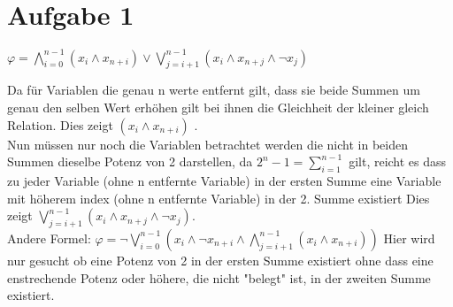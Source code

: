 \section*{Aufgabe 1}


$\varphi = \bigwedge_{i=0}^{n-1}(x_i \wedge x_{n+i}) \vee \bigvee_{j=i+1}^{n-1}( x_i \wedge x_{n+j} \wedge \neg x_{j})$ 



Da für Variablen die genau n werte entfernt gilt, dass sie beide Summen um genau den selben Wert erhöhen gilt bei ihnen die Gleichheit der kleiner gleich Relation. Dies zeigt $(x_i \wedge x_{n+i})$ .\\


Nun müssen nur noch die Variablen betrachtet werden die nicht in beiden Summen dieselbe Potenz von 2 darstellen, da $2^n-1 = \sum_{i=1}^{n-1}$ gilt, reicht es dass zu jeder Variable (ohne n entfernte Variable) in der ersten Summe eine Variable mit höherem index (ohne n entfernte Variable) in der 2. Summe  existiert
Dies zeigt $ \bigvee_{j=i+1}^{n-1}( x_i \wedge x_{n+j} \wedge \neg x_{j})$. \\



Andere Formel: $ \varphi = \neg \bigvee_{i=0}^{n-1}(x_i \wedge \neg x_{n+i} \wedge \bigwedge_{j=i+1}^{n-1} (x_i \wedge x_{n+i}))$ 
Hier wird nur gesucht ob eine Potenz von 2 in der ersten Summe existiert ohne dass eine enstrechende Potenz oder höhere, die nicht "belegt" ist, in der zweiten Summe existiert.